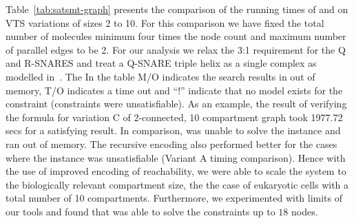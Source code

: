 

%
Table~\ref{tab:satsmt-graph} presents the comparison of the running times of {\smttool} and {\sattool} on VTS variations of sizes 2 to 10.
%
For this comparison we have fixed the total number of molecules minimum four times the node count 
%
and maximum number of parallel
edges to be 2.
%
For our analysis we relax the 3:1 requirement for the Q and R-SNARES and treat a Q-SNARE triple helix as a single complex as modelled in~\cite{shukla2017discovering}.
%
The 
%
In the table M/O indicates the search results in out of memory, T/O indicates a time out and ``!'' indicate that no model exists for the constraint  (constraints were unsatisfiable).
%
%
As an example, the result of verifying the formula for variation C of 2-connected, 10 compartment graph took 1977.72 secs for a satisfying result.
%
In comparison, {\sattool} was unable to solve the instance and ran out of memory.
%
% 
The recursive encoding also performed better for the cases where the instance was unsatisfiable (Variant A timing comparison).
%
Hence with the use of improved encoding of reachability, we were able to scale the system to the biologically relevant compartment size, the
the case of eukaryotic cells with a total number of 10 compartments.
%
Furthermore, we experimented with limits of our tools and found that {\smttool} was able to solve the constraints up to $18$ nodes.

